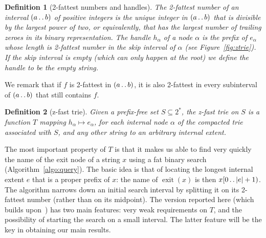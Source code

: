 \documentclass{article}
\newtheorem{definition}{Definition}
\newcommand{\exit}[1]{\operatorname{exit}(#1)}
\newcommand{\?}{\mskip1.5mu}
\def\..{\,\mathpunct{\ldotp\ldotp}} %
\begin{document}
\begin{definition}[2-fattest numbers and handles] 
\label{def:twofattest}
The \emph{2-fattest number} of an interval
$(a\..b)$ of positive integers is the unique integer in $(a\..b)$ that is
divisible by the largest power of two, or equivalently, that has the largest
number of trailing zeroes in its binary representation. The \emph{handle}
$h_\alpha$ of a node $\alpha$ is the prefix of $e_\alpha$ whose length is 2-fattest number in the skip interval of $\alpha$
(see Figure~\ref{fig:ztrie}). If the skip interval is empty (which can only
happen at the root) we define the handle to be the empty string.
\end{definition}
We remark that if $f$ is 2-fattest in $(a\..b)$, it is also 2-fattest in every
subinterval of $(a\..b)$ that still contains $f$.

\begin{definition}[z-fast trie]
Given a prefix-free set $S\subseteq 2^*$, the \emph{z-fast trie on $S$} is 
a function $T$ mapping $h_\alpha \mapsto e_\alpha$, for each internal node
$\alpha$ of the compacted trie associated with $S$, and any other string to an
arbitrary internal extent.
\end{definition}

The most important property of $T$ is that it makes us able to find very quickly
the name of the exit node of a string $x$ using 
a fat binary search (Algorithm~\ref{algo:query}). The basic idea is that of locating the
longest internal extent $e$ that is a proper prefix of $x$:
the name of $\exit x$ is then $x[0\..|e|+1)$. The algorithm
narrows down an initial search interval by splitting it on its 2-fattest number (rather than on its midpoint).
The version reported here (which builds upon~\cite{BBVDZT}) has two main features:
very weak requirements on $T$, and the possibility of starting the search on a small interval. The
latter feature will be the key in obtaining our main results.
\end{document}
